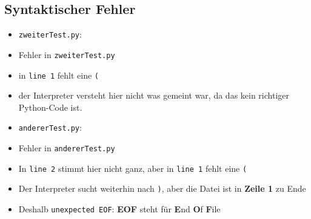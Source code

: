 \subsection{Syntaktischer Fehler}

\begin{frame}
	\slidehead
	\begin{itemize}
		\item \texttt{zweiterTest.py}:
		\pause
		\pause
		\item Fehler in \texttt{zweiterTest.py}
		\pause
		\item in \texttt{line 1} fehlt eine \texttt{(}
		\item der Interpreter versteht hier nicht was gemeint war, da das kein richtiger Python-Code ist.
	\end{itemize}
\end{frame}

\begin{frame}
	\slidehead
	\begin{itemize}
		\item \texttt{andererTest.py}:
		\pause
		\pause
		\item Fehler in \texttt{andererTest.py}
		\pause
		\item In \texttt{line 2} stimmt hier nicht ganz, aber in \texttt{line 1} fehlt eine \texttt{(}
		\pause
		\item Der Interpreter sucht weiterhin nach \texttt{)}, aber die Datei ist in \textbf{Zeile 1} zu Ende
		\pause
		\item Deshalb \texttt{unexpected EOF}: \textbf{EOF} steht für \textbf{E}nd \textbf{O}f \textbf{F}ile
	\end{itemize}
\end{frame}

\livecoding


